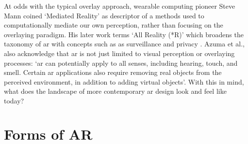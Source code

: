 At odds with the typical overlay approach, wearable computing pioneer Steve Mann coined `Mediated Reality' \citeyearpar{mann1994} as descriptor of a methods used to computationally mediate our own perception, rather than focusing on the overlaying paradigm. His later work terms `All Reality (*R)' which broadens the taxonomy of \gls{ar} with concepts such as as surveillance and privacy \citeyearpar{mann2018}. Azuma et al., also acknowledge that \gls{ar} is not just limited to visual perception or overlaying processes: `\gls{ar} can potentially apply to all senses, including hearing, touch, and smell. Certain \gls{ar} applications also require removing real objects from the perceived environment, in addition to adding virtual objects'. With this in mind, what does the landscape of more contemporary \gls{ar} design look and feel like today?




\section{Forms of AR}\label{sec: ar-forms}
